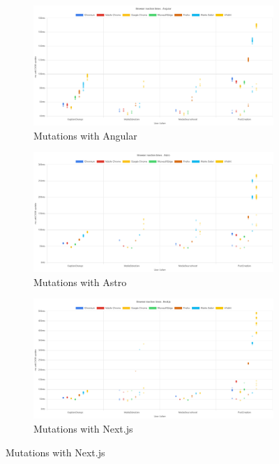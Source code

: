 \documentclass[a4paper, 10pt]{article}
\begin{document}
\begin{figure}[ht!]
  \centering
  \begin{subfigure}{0.9\linewidth}
    \begin{center}
      \includegraphics[width=\linewidth, keepaspectratio]{img/playwright-results/framework/Angular.png}
    \end{center}
    \caption{Mutations with Angular}\label{subfig:PW:Angular}
  \end{subfigure}
  \begin{subfigure}{0.9\linewidth}
    \begin{center}
      \includegraphics[width=\linewidth, keepaspectratio]{img/playwright-results/framework/Astro.png}
    \end{center}
    \caption{Mutations with Astro}\label{subfig:PW:Astro}
  \end{subfigure}
  \begin{subfigure}{0.9\linewidth}
    \begin{center}
      \includegraphics[width=\linewidth, keepaspectratio]{img/playwright-results/framework/Next.png}
    \end{center}
    \caption{Mutations with Next.js}\label{subfig:PW:Next}
  \end{subfigure}
\end{figure}
\end{document}
